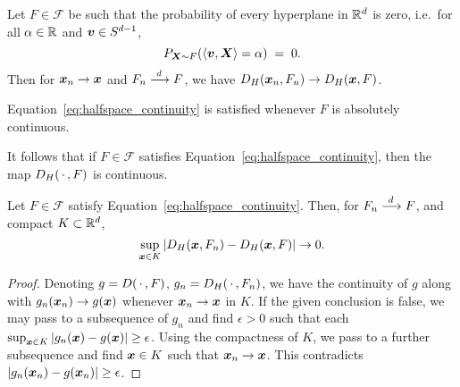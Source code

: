 \begin{theorem}
    Let $F \in \mathscr{F}$ be such that the probability of every hyperplane
    in $\mathbb{R}^d$ is zero, i.e.\ for all $\alpha \in \mathbb{R}$ and $\bm{v} \in S^{d - 1}$,
    \begin{equation}
        P_{\bm{X} \sim F}(\langle \bm{v}, \bm{X} \rangle = \alpha) \;=\; 0. \label{eq:halfspace_continuity}
    \end{equation}
    Then for $\bm{x}_n \to \bm{x}$ and $F_n \overset{d\,}{\longrightarrow} F$, we have $D_H(\bm{x}_n, F_n) \to
    D_H(\bm{x}, F)$.
\end{theorem}
\begin{remark}
    Equation~\ref{eq:halfspace_continuity} is satisfied whenever $F$ is
    absolutely continuous.
\end{remark}
\begin{remark}
    It follows that if $F \in \mathscr{F}$ satisfies
    Equation~\ref{eq:halfspace_continuity}, then the map $D_H(\,\cdot\,, F)$ is
    continuous.
\end{remark}

\begin{corollary}
    Let $F \in \mathscr{F}$ satisfy Equation~\ref{eq:halfspace_continuity}.
    Then, for $F_n \overset{d\,}{\longrightarrow} F$, and compact $K \subset \mathbb{R}^d$,
    \begin{equation}
        \sup_{\bm{x} \in K} |D_H(\bm{x}, F_n) - D_H(\bm{x}, F)| \to 0.
    \end{equation}
\end{corollary}
\begin{proof}
    Denoting $g = D(\,\cdot\,, F)$, $g_n = D_H(\,\cdot\,, F_n)$, we have the
    continuity of $g$ along with $g_n(\bm{x}_n) \to g(\bm{x})$ whenever $\bm{x}_n \to
    \bm{x}$ in $K$.
    If the given conclusion is false, we may pass to a subsequence of $g_n$
    and find $\epsilon > 0$ such that each $\sup_{\bm{x} \in K} |g_n(\bm{x}) -
    g(\bm{x})| \geq \epsilon$.
    Using the compactness of $K$, we pass to a further subsequence and find
    $\bm{x} \in K$ such that $\bm{x}_n \to \bm{x}$.
    This contradicts $|g_n(\bm{x}_n) - g(\bm{x}_n)| \geq \epsilon$.
\end{proof}


